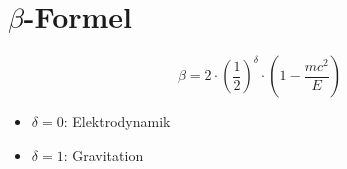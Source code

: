 \section{\texorpdfstring{$\beta$-Formel}{beta-Formel}}
\[ \beta = 2 \cdot \left( \frac{1}{2} \right)^{\delta} \cdot \left(1 - \frac{m c^2}{E}\right) \]

\begin{itemize}
    \item $\delta=0$: Elektrodynamik
    \item $\delta=1$: Gravitation
\end{itemize}
